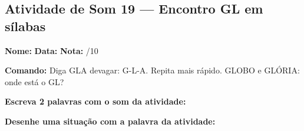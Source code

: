 \subsection{Atividade de Som 19 --- Encontro GL em sílabas}
\begin{exercicio}



\noindent\textbf{Nome:} \underline{\hspace{3.2cm}} \quad \textbf{Data:} \underline{\hspace{1.6cm}} \quad \textbf{Nota:} \underline{\hspace{0.9cm}}/10


\noindent\textbf{Comando:} Diga GLA devagar: G-L-A. Repita mais rápido. GLOBO e GLÓRIA: onde está o GL?


\begin{center}
\end{center}

\noindent\textbf{Escreva 2 palavras com o som da atividade:}

\begin{center}
  \underline{\hspace{3cm}} \quad \underline{\hspace{3cm}}
\end{center}

\noindent\textbf{Desenhe uma situação com a palavra da atividade:}

\begin{center}
\end{center}

\end{exercicio}



